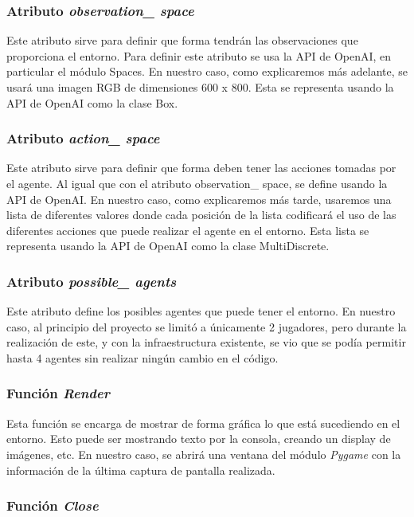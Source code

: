 \subsubsection*{Atributo \textit{observation\_ space}}

Este atributo sirve para definir que forma tendrán las observaciones que proporciona el entorno. Para definir este atributo se usa la API de OpenAI, en particular el módulo Spaces. En nuestro caso, como explicaremos más adelante, se usará una imagen RGB de dimensiones 600 x 800. Esta se representa usando la API de OpenAI como la clase Box.

\subsubsection*{Atributo \textit{action\_ space}}

Este atributo sirve para definir que forma deben tener las acciones tomadas por el agente. Al igual que con el atributo observation\_ space, se define usando la API de OpenAI. En nuestro caso, como explicaremos más tarde, usaremos una lista de diferentes valores donde cada posición de la lista codificará el uso de las diferentes acciones que puede realizar el agente en el entorno. Esta lista se representa usando la API de OpenAI como la clase MultiDiscrete.

\subsubsection*{Atributo \textit{possible\_ agents}}

Este atributo define los posibles agentes que puede tener el entorno. En nuestro caso, al principio del proyecto se limitó a únicamente 2 jugadores, pero durante la realización de este, y con la infraestructura existente, se vio que se podía permitir hasta 4 agentes sin realizar ningún cambio en el código.

\subsubsection*{Función \textit{Render}}

Esta función se encarga de mostrar de forma gráfica lo que está sucediendo en el entorno. Esto puede ser mostrando texto por la consola, creando un display de imágenes, etc. En nuestro caso, se abrirá una ventana del módulo \textit{Pygame} \cite {pygame} con la información de la última captura de pantalla realizada.

\subsubsection*{Función \textit{Close}}

